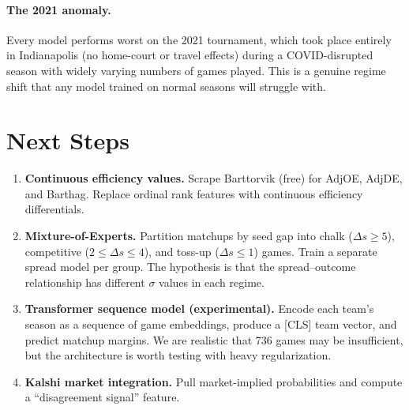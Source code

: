 \documentclass[11pt,a4paper]{article}
\begin{document}
\paragraph{The 2021 anomaly.} Every model performs worst on the 2021 tournament, which took place entirely in Indianapolis (no home-court or travel effects) during a COVID-disrupted season with widely varying numbers of games played. This is a genuine regime shift that any model trained on normal seasons will struggle with.


\section{Next Steps}

\begin{enumerate}[nosep]
    \item \textbf{Continuous efficiency values.} Scrape Barttorvik (free) for AdjOE, AdjDE, and Barthag. Replace ordinal rank features with continuous efficiency differentials.
    \item \textbf{Mixture-of-Experts.} Partition matchups by seed gap into chalk ($\Delta s \geq 5$), competitive ($2 \leq \Delta s \leq 4$), and toss-up ($\Delta s \leq 1$) games. Train a separate spread model per group. The hypothesis is that the spread--outcome relationship has different $\sigma$ values in each regime.
    \item \textbf{Transformer sequence model (experimental).} Encode each team's season as a sequence of game embeddings, produce a [CLS] team vector, and predict matchup margins. We are realistic that 736 games may be insufficient, but the architecture is worth testing with heavy regularization.
    \item \textbf{Kalshi market integration.} Pull market-implied probabilities and compute a ``disagreement signal'' feature.
\end{enumerate}
\end{document}
